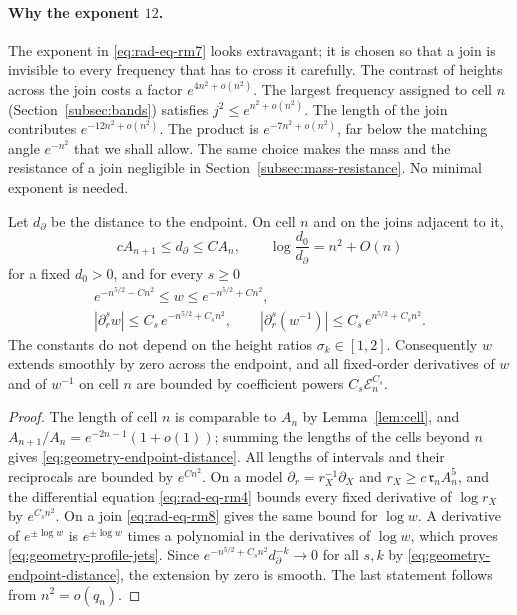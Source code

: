 \paragraph{Why the exponent $12$.}
The exponent in \eqref{eq:rad-eq-rm7} looks extravagant; it is chosen
so that a join is invisible to every frequency that has to cross it
carefully. The contrast of heights across the join costs a factor
$e^{4n^2+o(n^2)}$. The largest frequency assigned to cell $n$
(Section~\ref{subsec:bands}) satisfies $j^2\le e^{n^2+o(n^2)}$. The
length of the join contributes $e^{-12n^2+o(n^2)}$. The product is
$e^{-7n^2+o(n^2)}$, far below the matching angle $e^{-n^2}$ that we
shall allow. The same choice makes the mass and the resistance of a
join negligible in Section~\ref{subsec:mass-resistance}. No minimal
exponent is needed.

\begin{lemma}\label{lem:tail-flat}
Let $d_\partial$ be the distance to the endpoint. On cell $n$ and on
the joins adjacent to it,
\begin{equation}\label{eq:geometry-endpoint-distance}
 cA_{n+1}\le d_\partial\le CA_n,
 \qquad \log\frac{d_0}{d_\partial}=n^2+O(n)
\end{equation}
for a fixed $d_0>0$, and for every $s\ge0$
\begin{equation}\label{eq:geometry-profile-jets}
 \begin{gathered}
 e^{-n^{5/2}-Cn^2}\le w\le e^{-n^{5/2}+Cn^2},\\
 |\partial_r^sw|\le C_s\,e^{-n^{5/2}+C_sn^2},\qquad
 |\partial_r^s(w^{-1})|\le C_s\,e^{n^{5/2}+C_sn^2}.
 \end{gathered}
\end{equation}
The constants do not depend on the height ratios $\sigma_k\in[1,2]$.
Consequently $w$ extends smoothly by zero across the endpoint, and
all fixed-order derivatives of $w$ and of $w^{-1}$ on cell $n$ are
bounded by coefficient powers $C_s\mathcal E_n^{C_s}$.
\end{lemma}

\begin{proof}
The length of cell $n$ is comparable to $A_n$ by
Lemma~\ref{lem:cell}, and $A_{n+1}/A_n=e^{-2n-1}(1+o(1))$; summing the
lengths of the cells beyond $n$ gives
\eqref{eq:geometry-endpoint-distance}. All lengths of intervals and
their reciprocals are bounded by $e^{Cn^2}$. On a model
$\partial_r=r_X^{-1}\partial_X$ and $r_X\ge c\,\mathfrak r_nA_n^5$, and
the differential equation \eqref{eq:rad-eq-rm4} bounds every fixed
derivative of $\log r_X$ by $e^{C_sn^2}$. On a join
\eqref{eq:rad-eq-rm8} gives the same bound for $\log w$. A derivative
of $e^{\pm\log w}$ is $e^{\pm\log w}$ times a polynomial in the
derivatives of $\log w$, which proves
\eqref{eq:geometry-profile-jets}. Since
$e^{-n^{5/2}+C_sn^2}d_\partial^{-k}\to0$ for all $s,k$ by
\eqref{eq:geometry-endpoint-distance}, the extension by zero is
smooth. The last statement follows from $n^2=o(q_n)$.
\end{proof}


